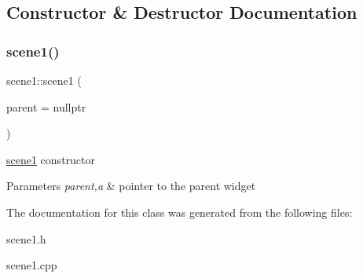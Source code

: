 \subsection{Constructor \& Destructor Documentation}
\mbox{\label{classscene1_a55f27703d7a712de182d8b1d1a0c6885}} 
\subsubsection{\texorpdfstring{scene1()}{scene1()}}
{\footnotesize\ttfamily scene1\+::scene1 (\begin{DoxyParamCaption}\item[{Q\+Widget $\ast$}]{parent = {\ttfamily nullptr} }\end{DoxyParamCaption})\hspace{0.3cm}{\ttfamily [explicit]}}



\hyperlink{classscene1}{scene1} constructor 


\begin{DoxyParams}{Parameters}
{\em parent,a} & pointer to the parent widget \\
\hline
\end{DoxyParams}


The documentation for this class was generated from the following files\+:\begin{DoxyCompactItemize}
\item 
scene1.\+h\item 
scene1.\+cpp\end{DoxyCompactItemize}
